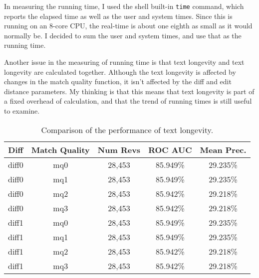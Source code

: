 In measuring the running time, I used the shell built-in
\texttt{time} command, which reports the elapsed time as well
as the user and system times.
Since this is running on an 8-core CPU, the real-time is about
one eighth as small as it would normally be.
I decided to sum the user and system times, and use that as
the running time.

Another issue in the measuring of running time is that
text longevity and text longevity are calculated together.
Although the text longevity is affected by changes in the
match quality function, it isn't affected by the diff and
edit distance parameters.
My thinking is that this means that text longevity is part
of a fixed overhead of calculation, and that the trend
of running times is still useful to examine.

\begin{table}[tbph]
\begin{center}
\begin{tabular}{|c|c||c|c|c|}
\hline
Diff & Match Quality & Num Revs & ROC AUC & Mean Prec. \\
\hline
\hline
diff0 & mq0 & 28,453 & 85.949\% & 29.235\% \\
diff0 & mq1 & 28,453 & 85.949\% & 29.235\% \\
diff0 & mq2 & 28,453 & 85.942\% & 29.218\% \\
diff0 & mq3 & 28,453 & 85.942\% & 29.218\% \\
diff1 & mq0 & 28,453 & 85.949\% & 29.235\% \\
diff1 & mq1 & 28,453 & 85.949\% & 29.235\% \\
diff1 & mq2 & 28,453 & 85.942\% & 29.218\% \\
diff1 & mq3 & 28,453 & 85.942\% & 29.218\% \\
\hline
\end{tabular}
\end{center}
\caption{Comparison of the performance of text longevity.
\label{tab:textlongeval}
}
\end{table}



